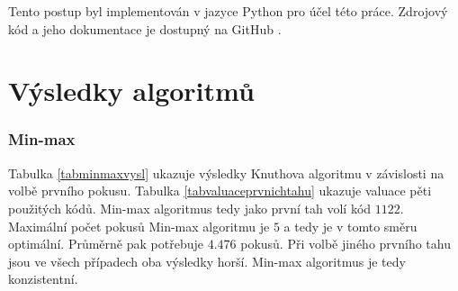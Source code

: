 Tento postup byl implementován v jazyce Python pro účel této práce. Zdrojový kód a jeho dokumentace je dostupný na GitHub \cite{Simsa_Strategies_for_Mastermind_2025}. 





\section{Výsledky algoritmů}

\subsubsection{Min-max}

Tabulka \ref{tabminmaxvysl} ukazuje výsledky Knuthova algoritmu v závislosti na volbě prvního pokusu. Tabulka \ref{tabvaluaceprvnichtahu} ukazuje valuace pěti použitých kódů. Min-max algoritmus tedy jako první tah volí kód $1122$. Maximální počet pokusů Min-max algoritmu je $5$ a tedy je v tomto směru optimální. Průměrně pak potřebuje $4.476$ pokusů. Při volbě jiného prvního tahu jsou ve všech případech oba výsledky horší. Min-max algoritmus je tedy konzistentní.

